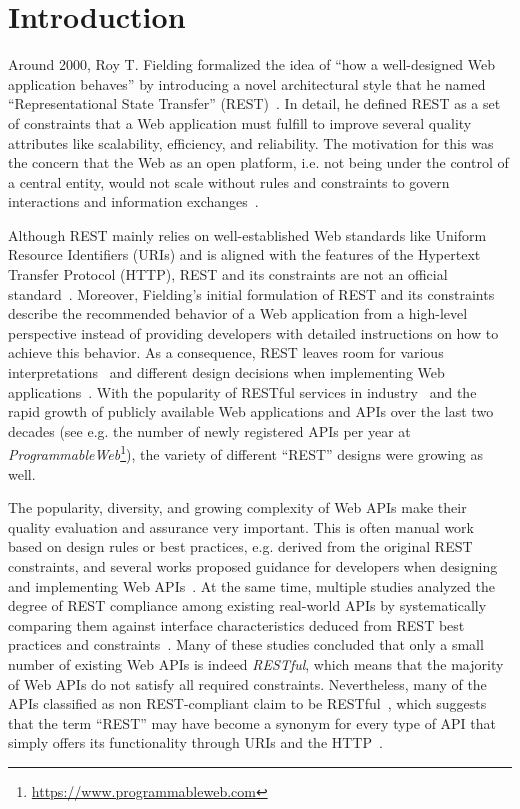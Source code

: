 \documentclass[runningheads]{llncs}
\begin{document}
\section{Introduction}
\label{sec:introduction}
Around 2000, Roy T. Fielding formalized the idea of \enquote{how a well-designed Web application behaves} by introducing a novel architectural style that he named \enquote{Representational State Transfer} (REST)~\cite{thesis:Rest2000}.
In detail, he defined REST as a set of constraints that a Web application must fulfill to improve several quality attributes like scalability, efficiency, and reliability.
The motivation for this was the concern that the Web as an open platform, i.e. not being under the control of a central entity, would not scale without rules and constraints to govern interactions and information exchanges~\cite{thesis:Rest2000,book:RestApiDesignRulebook2011}.

Although REST mainly relies on well-established Web standards like Uniform Resource Identifiers (URIs) and is aligned with the features of the Hypertext Transfer Protocol (HTTP), REST and its constraints are not an official standard~\cite{article:Rodriguez2016}.
Moreover, Fielding's initial formulation of REST and its constraints describe the recommended behavior of a Web application from a high-level perspective instead of providing developers with detailed instructions on how to achieve this behavior.
As a consequence, REST leaves room for various interpretations~\cite{conference:Renzel2012} and different design decisions when implementing Web applications~\cite{article:Rodriguez2016}.
With the popularity of RESTful services in industry~\cite{Bogner2019-ICSA,Schermann2016} and the rapid growth of publicly available Web applications and APIs over the last two decades (see e.g. the number of newly registered APIs per year at \textit{ProgrammableWeb}\footnote{\url{https://www.programmableweb.com}}), the variety of different \enquote{REST} designs were growing as well.

The popularity, diversity, and growing complexity of Web APIs make their quality evaluation and assurance very important.
This is often manual work based on design rules or best practices, e.g. derived from the original REST constraints, and several works proposed guidance for developers when designing and implementing Web APIs~\cite{book:RestApiDesignRulebook2011,article:Palma2017,conference:Petrillo2016}.
At the same time, multiple studies analyzed the degree of REST compliance among existing real-world APIs by systematically comparing them against interface characteristics deduced from REST best practices and constraints~\cite{Neumann2018,conference:Renzel2012,article:Rodriguez2016}.
Many of these studies concluded that only a small number of existing Web APIs is indeed \textit{RESTful}, which means that the majority of Web APIs do not satisfy all required constraints.
Nevertheless, many of the APIs classified as non REST-compliant claim to be RESTful~\cite{Neumann2018}, which suggests that the term \enquote{REST} may have become a synonym for every type of API that simply offers its functionality through URIs and the HTTP~\cite{conference:Renzel2012,book:RestInPractice:2010}.
\end{document}
